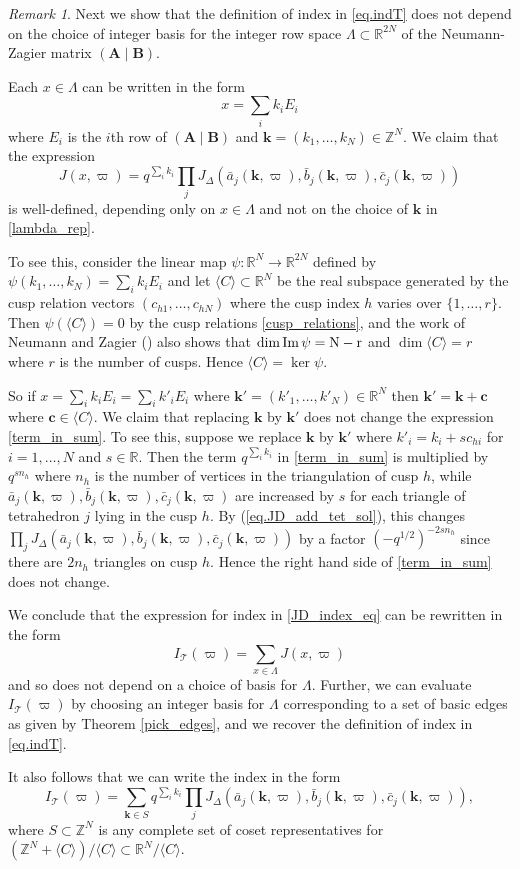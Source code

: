 \documentclass[12pt]{amsart}
\theoremstyle{definition}
\theoremstyle{remark}
\newtheorem{rmk}[thm]{Remark}
\def\R{\mathbb{R}}
\def\Z{\mathbb{Z}}
\def\kk{\boldsymbol{k}}
\newcommand{\CT}{\mathcal{T}}
\def\be{  \begin{equation} }
\def\ee{  \end{equation} }
\newcommand{\mb}{\mathbf}
\def\JD{J_{\Delta}}
\begin{document}
\begin{rmk}\label{basis_indept}
Next we show that the definition of index in \eqref{eq.indT} does not depend on the 
choice of integer basis for the integer row space $\Lambda \subset \R^{2N}$ of the Neumann-Zagier 
matrix $(\mb A \mid \mb B)$.

Each $x \in \Lambda$ can be written in the form 
\be \label{lambda_rep}
x = \sum_i k_i E_i
\ee
 where $E_i$ is the 
$i$th row of $(\mb A \mid \mb B)$ and $\kk =(k_1, \ldots, k_N) \in \Z^N$.
We claim that the expression
\be\label{term_in_sum}
J(x,\varpi) = q^{\sum_i k_i}   \prod_j  \JD(\bar a_j(\kk,\varpi), \bar b_j(\kk,\varpi) , \bar c_j(\kk,\varpi))
\ee
is well-defined,  depending only on $x \in \Lambda$ and not on the choice of $\kk$ in \eqref{lambda_rep}.

To see this, consider the linear map 
$\psi : \R^N \to \R^{2N}$ defined by  $\psi(k_1, \ldots,k_N) = \sum_i k_i E_i$
and let $\langle C \rangle \subset \R^N$ be the real subspace generated by the cusp relation vectors
$(c_{h1}, \ldots, c_{hN})$ where the cusp index $h$ varies over $\{1, \ldots, r \}$. 
Then $\psi(\langle C \rangle) = 0$ by the cusp relations  \eqref{cusp_relations}, 
and the work of Neumann and Zagier (\cite{NZ,Neumann-combi}) also shows that
$\dim \rm{Im}\, \psi =N-r$ and $\dim \langle C \rangle=r$
where $r$ is the number of cusps. Hence $\langle C \rangle = \ker \psi$. 

So if $x = \sum_i k_i E_i = \sum_i k'_i E_i$ where $\kk'=(k'_1, \ldots, k'_N) \in \R^N$ then
$\kk'=\kk + \boldsymbol{c}$ where  $\boldsymbol{c} \in \langle C \rangle$.
We claim that replacing $\kk$ by $\kk'$ does not change the  expression \eqref{term_in_sum}.
To see this, suppose
we replace $\kk$ by $\kk'$ where $k'_i= k_i + s  c_{hi} $ for $i=1, \ldots, N$ and $s \in \R$.
Then the term $q^{\sum_i k_i}$ in \eqref{term_in_sum} is multiplied 
by $q^{s n_h}$ where  $n_h$ is the number of vertices in the triangulation of cusp $h$, while 
$\bar a_j(\kk,\varpi), \bar b_j(\kk,\varpi) , \bar c_j(\kk,\varpi)$ are increased by $s$ for each
triangle of tetrahedron $j$ lying in the cusp $h$.
By (\ref{eq.JD_add_tet_sol}), this changes $\prod_j \JD(\bar a_j(\kk,\varpi), \bar b_j(\kk,\varpi) , \bar c_j(\kk,\varpi))$ by a factor $(-q^{1/2})^{-2s n_h}$ since there are $2n_h$ triangles on cusp $h$.
Hence the right hand side of \eqref{term_in_sum} does not change.

We conclude that the expression for index in \eqref{JD_index_eq} can be rewritten in the form
\be
I_\CT(\varpi) = \sum_{x \in \Lambda} J(x,\varpi)
\ee
and so does not depend on a choice of basis for $\Lambda$.
Further, we can evaluate $I_\CT(\varpi)$ by choosing an integer basis for $\Lambda$
corresponding to a set of basic edges as given by Theorem \ref{pick_edges}, and we recover
the definition of index in  \eqref{eq.indT}.

It also follows that we can write the index in the form 
\be
I_\CT(\varpi) = \sum_{\kk \in S} q^{\sum_i k_i}   \prod_j 
\JD(\bar a_j(\kk,\varpi), \bar b_j(\kk,\varpi) , \bar c_j(\kk,\varpi)),
\ee
where $S \subset \Z^N$ is any complete set of coset representatives for 
$(\Z^N + \langle C \rangle)/\langle C \rangle \subset \R^N /\langle C \rangle$. 
 \end{rmk}
\end{document}
